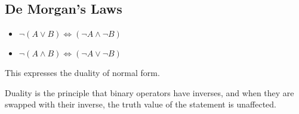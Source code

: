 \subsection{De Morgan's Laws}

\begin{itemize}
\item \(\neg (A\lor B)\Leftrightarrow (\neg A\land \neg B)\)
\item \(\neg (A\land B)\Leftrightarrow (\neg A\lor \neg B)\)
\end{itemize}

This expresses the duality of normal form.

Duality is the principle that binary operators have inverses, and when they are swapped with their inverse, the truth value of the statement is unaffected.


